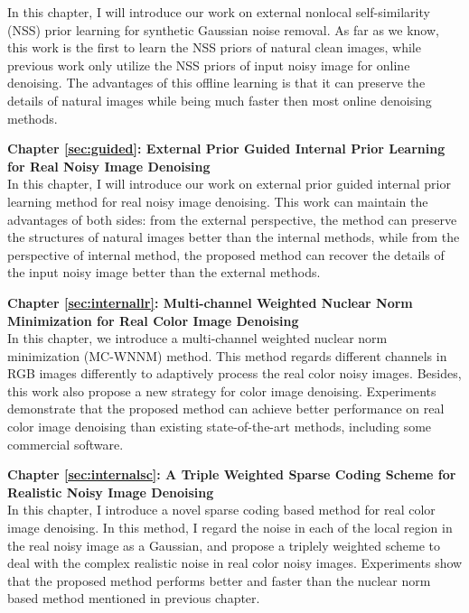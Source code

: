In this chapter, I will introduce our work on external nonlocal self-similarity (NSS) prior learning for synthetic Gaussian noise removal. As far as we know, this work is the first to learn the NSS priors of natural clean images, while previous work only utilize the NSS priors of input noisy image for online denoising. The advantages of this offline learning is that it can preserve the details of natural images while being much faster then most online denoising methods.


\textbf{Chapter \ref{sec:guided}: External Prior Guided Internal Prior Learning for Real Noisy Image Denoising} \\[0.2em]

In this chapter, I will introduce our work on external prior guided internal prior learning method for real noisy image denoising. This work can maintain the advantages of both sides: from the external perspective, the method can preserve the structures of natural images better than the internal methods, while from the perspective of internal method, the proposed method can recover the details of the input noisy image better than the external methods.



\textbf{Chapter \ref{sec:internallr}: Multi-channel Weighted Nuclear Norm Minimization for Real Color Image Denoising} \\[0.2em]

In this chapter, we introduce a multi-channel weighted nuclear norm minimization (MC-WNNM) method. This method regards different channels in RGB images differently to adaptively process the real color noisy images. Besides, this work also propose a new strategy for color image denoising. Experiments demonstrate that the proposed method can achieve better performance on real color image denoising than existing state-of-the-art methods, including some commercial software.



\textbf{Chapter \ref{sec:internalsc}: A Triple Weighted Sparse Coding Scheme for Realistic Noisy Image Denoising} \\[0.2em]

In this chapter, I introduce a novel sparse coding based method for real color image denoising. In this method, I regard the noise in each of the local region in the real noisy image as a Gaussian, and propose a triplely weighted scheme to deal with the complex realistic noise in real color noisy images. Experiments show that the proposed method performs better and faster than the nuclear norm based method mentioned in previous chapter.


